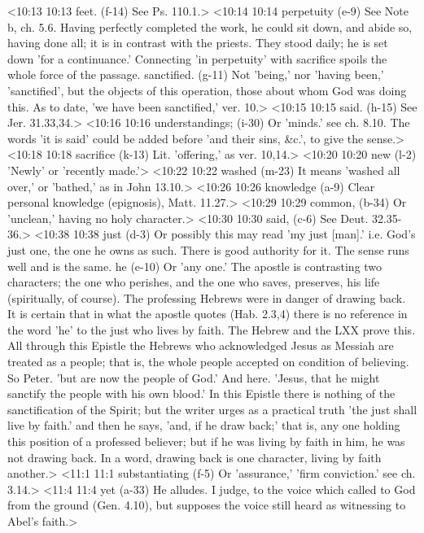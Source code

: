 <10:13 10:13  feet. (f-14)  See Ps. 110.1.>
<10:14 10:14  perpetuity (e-9)  See Note b, ch. 5.6. Having perfectly completed the work, he  could sit down, and abide so, having done all; it is in  contrast with the priests. They stood daily; he is set down  'for a continuance.' Connecting 'in perpetuity' with sacrifice  spoils the whole force of the passage.
  sanctified. (g-11)  Not 'being,' nor 'having been,' 'sanctified', but the objects  of this operation, those about whom God was doing this. As to  date, 'we have been sanctified,' ver. 10.>
<10:15 10:15  said. (h-15)  See Jer. 31.33,34.>
<10:16 10:16  understandings; (i-30)  Or 'minds.' see ch. 8.10. The words 'it is said' could be  added before 'and their sins, &c.', to give the sense.>
<10:18 10:18  sacrifice (k-13)  Lit. 'offering,' as ver. 10,14.>
<10:20 10:20  new (l-2)  'Newly' or 'recently made.'>
<10:22 10:22  washed (m-23)  It means 'washed all over,' or 'bathed,' as in John 13.10.>
<10:26 10:26  knowledge (a-9)  Clear personal knowledge (epignosis), Matt. 11.27.>
<10:29 10:29  common, (b-34)  Or 'unclean,' having no holy character.>
<10:30 10:30  said, (c-6)  See Deut. 32.35-36.>
<10:38 10:38  just (d-3)  Or possibly this may read 'my just [man].' i.e. God's just  one, the one he owns as such. There is good authority for it.  The sense runs well and is the same.
  he (e-10)  Or 'any one.' The apostle is contrasting two characters; the  one who perishes, and the one who saves, preserves, his life  (spiritually, of course). The professing Hebrews were in danger  of drawing back. It is certain that in what the apostle  quotes (Hab. 2.3,4) there is no reference in the word 'he' to  the just who lives by faith. The Hebrew and the LXX prove this.  All through this Epistle the Hebrews who acknowledged Jesus as  Messiah are treated as a people; that is, the whole people  accepted on condition of believing. So Peter. 'but are now the  people of God.' And here. 'Jesus, that he might sanctify the  people with his own blood.' In this Epistle there is nothing of  the sanctification of the Spirit; but the writer urges as a  practical truth 'the just shall live by faith.' and then he  says, 'and, if he draw back;' that is, any one holding this  position of a professed believer; but if he was living by faith  in him, he was not drawing back. In a word, drawing back is  one character, living by faith another.>
<11:1 11:1  substantiating (f-5)  Or 'assurance,' 'firm conviction.' see ch. 3.14.>
<11:4 11:4  yet (a-33)  He alludes. I judge, to the voice which called to God from  the ground (Gen. 4.10), but supposes the voice still heard as  witnessing to Abel's faith.>
